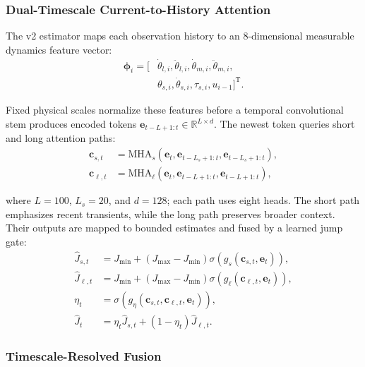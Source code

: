 \documentclass[letterpaper,journal]{IEEEtran}
\begin{document}
\subsubsection{Dual-Timescale Current-to-History Attention}

The v2 estimator maps each observation history to an 8-dimensional measurable dynamics feature vector:
\begin{equation}
\begin{aligned}
\bm{\phi}_i = [&\dot{\theta}_{l,i}, \ddot{\theta}_{l,i}, \dot{\theta}_{m,i}, \ddot{\theta}_{m,i}, \\
&\theta_{s,i}, \dot{\theta}_{s,i}, \tau_{s,i}, u_{i-1}]^\mathrm{T}.
\end{aligned}
\label{eq:fast_features}
\end{equation}

\noindent Fixed physical scales normalize these features before a temporal convolutional stem produces encoded tokens $\bm{e}_{t-L+1:t}\in\mathbb{R}^{L\times d}$. The newest token queries short and long attention paths:
\begin{equation}
\begin{aligned}
\bm{c}_{s,t} &= \mathrm{MHA}_s(\bm{e}_t,\bm{e}_{t-L_s+1:t},\bm{e}_{t-L_s+1:t}), \\
\bm{c}_{\ell,t} &= \mathrm{MHA}_{\ell}(\bm{e}_t,\bm{e}_{t-L+1:t},\bm{e}_{t-L+1:t}),
\end{aligned}
\label{eq:dual_attention}
\end{equation}

\noindent where $L=100$, $L_s=20$, and $d=128$; each path uses eight heads. The short path emphasizes recent transients, while the long path preserves broader context. Their outputs are mapped to bounded estimates and fused by a learned jump gate:
\begin{equation}
\begin{aligned}
\hat{J}_{s,t} &= J_{\min}+(J_{\max}-J_{\min})\sigma(g_s(\bm{c}_{s,t},\bm{e}_t)), \\
\hat{J}_{\ell,t} &= J_{\min}+(J_{\max}-J_{\min})\sigma(g_{\ell}(\bm{c}_{\ell,t},\bm{e}_t)), \\
\eta_t &= \sigma(g_{\eta}(\bm{c}_{s,t},\bm{c}_{\ell,t},\bm{e}_t)), \\
\hat{J}_t &= \eta_t\hat{J}_{s,t}+(1-\eta_t)\hat{J}_{\ell,t}.
\end{aligned}
\label{eq:inertia_estimate}
\end{equation}

\subsubsection{Timescale-Resolved Fusion}
\end{document}

